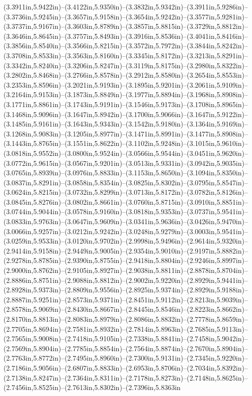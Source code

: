 (3.3911in,5.9422in)--(3.4122in,5.9350in)--(3.3832in,5.9342in)--(3.3911in,5.9286in)--(3.3736in,5.9245in)--(3.3657in,5.9158in)--(3.3654in,5.9242in)--(3.3577in,5.9281in)--(3.3737in,5.9167in)--(3.3603in,5.8789in)--(3.3857in,5.8815in)--(3.3729in,5.8812in)--(3.3646in,5.8645in)--(3.3757in,5.8493in)--(3.3916in,5.8536in)--(3.4041in,5.8416in)--(3.3856in,5.8540in)--(3.3566in,5.8215in)--(3.3572in,5.7972in)--(3.3844in,5.8242in)--(3.3708in,5.8533in)--(3.3563in,5.8160in)--(3.3345in,5.8172in)--(3.3213in,5.8291in)--(3.3342in,5.8240in)--(3.3206in,5.8247in)--(3.3119in,5.8175in)--(3.2980in,5.8322in)--(3.2802in,5.8468in)--(3.2766in,5.8578in)--(3.2912in,5.8580in)--(3.2654in,5.8553in)--(3.2353in,5.8596in)--(3.2021in,5.9193in)--(3.1895in,5.9201in)--(3.2061in,5.9109in)--(3.2164in,5.9153in)--(3.1873in,5.8849in)--(3.1977in,5.8894in)--(3.1968in,5.8908in)--(3.1771in,5.8861in)--(3.1743in,5.9191in)--(3.1546in,5.9173in)--(3.1708in,5.8965in)--(3.1468in,5.9096in)--(3.1647in,5.8942in)--(3.1700in,5.9066in)--(3.1647in,5.9122in)--(3.1485in,5.9161in)--(3.1643in,5.9343in)--(3.1542in,5.9180in)--(3.1364in,5.9169in)--(3.1268in,5.9083in)--(3.1205in,5.8977in)--(3.1471in,5.8991in)--(3.1477in,5.8908in)--(3.1443in,5.8765in)--(3.1551in,5.8622in)--(3.1102in,5.9248in)--(3.1015in,5.9610in)--(3.0818in,5.9552in)--(3.0800in,5.9524in)--(3.0566in,5.9544in)--(3.0451in,5.9620in)--(3.0772in,5.9615in)--(3.0567in,5.9201in)--(3.0513in,5.9331in)--(3.0942in,5.9035in)--(3.0765in,5.8939in)--(3.0976in,5.8833in)--(3.1153in,5.8650in)--(3.1094in,5.8350in)--(3.0837in,5.8291in)--(3.0858in,5.8354in)--(3.0825in,5.8302in)--(3.0795in,5.8547in)--(3.0624in,5.8215in)--(3.0732in,5.8299in)--(3.0713in,5.8172in)--(3.0782in,5.8126in)--(3.0845in,5.8276in)--(3.0802in,5.8661in)--(3.0760in,5.8715in)--(3.0910in,5.8851in)--(3.0744in,5.9044in)--(3.0578in,5.9160in)--(3.0818in,5.9353in)--(3.0737in,5.9541in)--(3.0833in,5.9763in)--(3.0647in,5.9609in)--(3.0341in,5.9636in)--(3.0426in,5.9470in)--(3.0066in,5.9257in)--(3.0212in,5.9242in)--(3.0248in,5.9279in)--(3.0003in,5.9541in)--(3.0259in,5.9533in)--(3.0120in,5.9702in)--(2.9998in,5.9496in)--(2.9614in,5.9320in)--(2.9414in,5.9158in)--(2.9449in,5.9005in)--(2.9354in,5.9010in)--(2.9197in,5.8882in)--(2.9278in,5.8785in)--(2.9390in,5.8755in)--(2.9418in,5.8804in)--(2.9246in,5.8997in)--(2.9000in,5.8762in)--(2.9105in,5.8927in)--(2.9038in,5.8811in)--(2.8878in,5.8704in)--(2.8886in,5.8751in)--(2.9088in,5.8812in)--(2.9002in,5.9220in)--(2.8929in,5.9441in)--(2.8928in,5.9373in)--(2.8809in,5.9556in)--(2.8925in,5.9374in)--(2.8929in,5.9188in)--(2.8887in,5.9251in)--(2.8573in,5.9371in)--(2.8451in,5.9112in)--(2.8213in,5.9039in)--(2.8578in,5.9069in)--(2.8430in,5.8667in)--(2.8445in,5.8546in)--(2.8223in,5.8662in)--(2.8170in,5.8813in)--(2.8083in,5.8979in)--(2.8086in,5.8832in)--(2.7778in,5.8659in)--(2.7705in,5.8694in)--(2.7581in,5.8932in)--(2.7814in,5.8963in)--(2.7685in,5.9113in)--(2.7565in,5.9008in)--(2.7418in,5.9105in)--(2.7338in,5.8841in)--(2.7458in,5.9042in)--(2.7569in,5.8904in)--(2.7785in,5.8854in)--(2.7564in,5.8874in)--(2.7670in,5.8904in)--(2.7763in,5.8772in)--(2.7495in,5.8960in)--(2.7300in,5.9131in)--(2.7345in,5.9220in)--(2.7186in,5.9056in)--(2.6807in,5.8833in)--(2.6953in,5.8706in)--(2.7034in,5.8392in)--(2.7138in,5.8247in)--(2.7364in,5.8311in)--(2.7178in,5.8273in)--(2.7148in,5.8625in)--(2.7456in,5.8525in)--(2.7613in,5.8302in)--(2.7396in,5.8363in